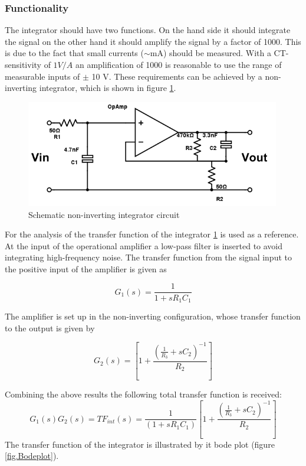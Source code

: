 \subsubsection{Functionality}
The integrator should have two functions. On the hand side it should integrate the signal on the other hand it should amplify the signal by a factor of 1000. This is due to the fact that small currents ($\sim$mA) should be measured. With a CT-sensitivity of $1V/A$ an amplification of 1000 is reasonable to use the range of measurable inputs of $\pm$ 10 V. \footnotemark These requirements can be achieved by a non-inverting integrator, which is shown in figure  \ref{fig.circuit}. 
\begin{figure}[H]
\includegraphics[width=0.99\textwidth]{figures/Method/integrator/circuit.png}
    \caption{Schematic non-inverting integrator circuit}
    \label{fig.circuit}
\end{figure}	

For the analysis of the transfer function of the integrator \ref{fig.circuit} is used as a reference.
At the input of the operational amplifier a low-pass filter is inserted to avoid integrating high-frequency noise.
The transfer function from the signal input to the positive input of the amplifier is given as

\begin{equation}
  G_1(s)=\frac{1}{1+sR_1C_1}
\end{equation}

The amplifier is set up in the non-inverting configuration, whose transfer function to the output is given by

\begin{equation}
 G_2(s)=\left[1+\frac{\left(\frac{1}{R_3}+sC_2\right)^{-1}}{R_2}\right]
\end{equation}

Combining the above results the following total transfer function is received:
\begin{equation}
	G_1(s)G_2(s)=TF_{int}(s)=\frac{1}{(1+s R_1 C_1)}\left[1+\frac{\left(\frac{1}{R_3}+sC_2\right)^{-1}}{R_2}\right]
\end{equation}
The transfer function of the integrator is illustrated by it bode plot (figure \ref{fig.Bodeplot}). 

